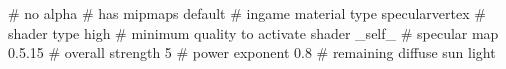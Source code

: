 # no alpha
# has mipmaps
default			 # ingame material type
specularvertex	         # shader type
high			 # minimum quality to activate shader
_self_			 # specular map
0.5.15 			 # overall strength
5 			 # power exponent
0.8			 # remaining diffuse sun light



